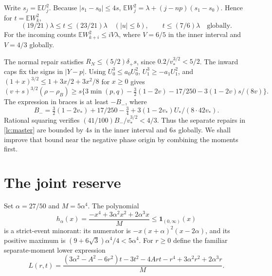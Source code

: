 \documentclass[11pt]{article}
\newcommand{\E}{\mathbb E}
\begin{document}
Write $s_j=\E U_j^2$. Because $|s_1-s_0|\le4s$,
$\E W_j^2=\lambda+(j-np)(s_1-s_0)$. Hence for $t=\E W_k^2$,
\begin{equation}\label{lc:variances}
 (19/21)\lambda\le t\le(23/21)\lambda\quad(|u|\le b),\qquad
 t\le(7/6)\lambda\quad\text{globally}.
\end{equation}
For the incoming counts $\E W_{k+i}^2\le iV\lambda$, where
$V=6/5$ in the inner interval and $V=4/3$ globally.

The normal repair satisfies $R_N\le(5/2)\delta_+s$, since
$0.2/v_*^{3/2}<5/2$. The inward caps fix the signs in $|Y-p|$.
Using $U_0^3\le a_0U_0^2$, $U_1^3\ge-a_1U_1^2$, and
$(1+x)^{3/2}\le1+3x/2+3x^2/8$ for $x\ge0$ gives
\[
 (v+s)^{3/2}(\rho-\rho_B)
 \ge s\{3\min(p,q)-\tfrac32(1-2v)-17/250
                           -3(1-2v)s/(8v)\}.
\]
The expression in braces is at least $-B_-$, where
\[
 B_-=\tfrac32(1-2v_*)+17/250-\tfrac34+
                         3(1-2v_*)U_*/(8\cdot42v_*).
\]
Rational squaring verifies $(41/100)B_-/v_*^{3/2}<4/3$.
Thus the separate repairs in \eqref{lc:master} are bounded by $4s$
in the inner interval and $6s$ globally. We shall improve that bound
near the negative phase origin by combining the moments first.

\section{The joint reserve}
Set $\alpha=27/50$ and $M=5\alpha^4$. The polynomial
\[
 h_\alpha(x)=\frac{-x^4+3\alpha^2x^2+2\alpha^3x}{M}
                                  \le\mathbf1_{(0,\infty)}(x)
\]
is a strict-event minorant: its numerator is
$-x(x+\alpha)^2(x-2\alpha)$, and its positive maximum is
$(9+6\sqrt3)\alpha^4/4<5\alpha^4$.
For $r\ge0$ define the familiar separate-moment lower expression
\begin{equation}\label{lc:L}
 L(r,t)=\frac{(3\alpha^2-A^2-6r^2)t-3t^2-4Art
                        -r^4+3\alpha^2r^2+2\alpha^3r}{M}.
\end{equation}
\end{document}
